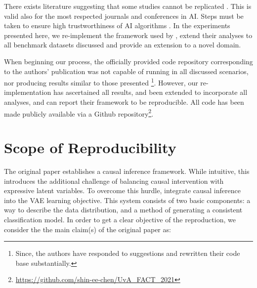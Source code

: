 There exists literature suggesting that some studies cannot be replicated \cite{Hutson725}. This is valid also for the most respected journals and conferences in AI. Steps must be taken to ensure high trustworthiness of AI algorithms \cite{gundersen2018state}. In the experiments presented here, we re-implement the framework used by \cite{oshaughnessy2020generative}, extend their analyses to all benchmark datasets discussed and provide an extension to a novel domain.

When beginning our process, the officially provided code repository corresponding to the authors' publication was not capable of running in all discussed scenarios, nor producing results similar to those presented \footnote{Since, the authors have responded to suggestions and rewritten their code base substantially.}. However, our re-implementation has ascertained all results, and been extended to incorporate all analyses, and can report their framework to be reproducible.
All code has been made publicly available via a Github repository\footnote{\url{https://github.com/shin-ee-chen/UvA_FACT_2021}}.

\section{Scope of Reproducibility}\label{sec:claims}

The original paper establishes a causal inference framework. While intuitive, this introduces the additional challenge of balancing causal intervention with expressive latent variables. To overcome this hurdle, \cite{oshaughnessy2020generative} integrate causal inference into the VAE learning objective. This system consists of two basic components: a way to describe the data distribution, and a method of generating a consistent classification model. In order to get a clear objective of the reproduction, we consider the the main claim(s) of the original paper as:

